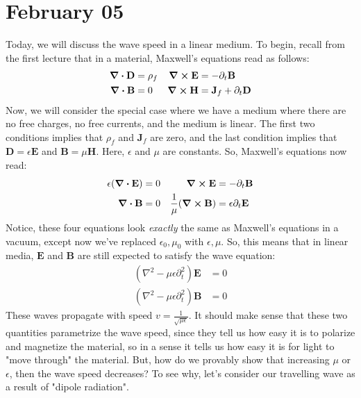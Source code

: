 \section{February 05}
Today, we will discuss the wave speed in a linear medium. To begin, recall from the first lecture that in a
material, Maxwell's equations read as follows:
\begin{align*}
	\div \mathbf{D} &= \rho_f & \curl \mathbf{E} &= -\partial_t \mathbf{B}\\
	\div \mathbf{B} &= 0 & \curl \mathbf{H} &= \mathbf{J}_f + \partial_t \mathbf{D} 
\end{align*}
Now, we will consider the special case where we have a medium where there are no free charges, no free
currents, and the medium is linear. The first two conditions implies that \( \rho_f \) and \( \mathbf{J}_f\)
are zero, and the last condition implies that \( \mathbf{D} = \epsilon \mathbf{E} \) and \( \mathbf{B} = \mu
\mathbf{H}\). Here, \( \epsilon \) and \( \mu \) are constants. So, Maxwell's equations now read:
\begin{align*}
	\epsilon (\div \mathbf{E}) &= 0 & \curl \mathbf{E} &= -\partial_t \mathbf{B}\\
	\div \mathbf{B} &= 0 & \frac{1}{\mu}(\curl \mathbf{B}) &= \epsilon \partial_t \mathbf{E}
\end{align*}
Notice, these four equations look \textit{exactly} the same as Maxwell's equations in a vacuum, except now
we've replaced \( \epsilon_0, \mu_0 \) with \( \epsilon, \mu \). So, this means that in linear media, \(
\mathbf{E} \) and \( \mathbf{B} \) are still expected to satisfy the wave equation:
\begin{align*}
	(\nabla^2 - \mu \epsilon \partial_t^2)\mathbf{E} &= 0\\
	(\nabla^2 - \mu \epsilon \partial_t^2) \mathbf{B} &= 0 
\end{align*}
These waves propagate with speed \( v = \frac{1}{\sqrt{\mu \epsilon}} \). It should make sense that these two
quantities parametrize the wave speed, since they tell us how easy it is to polarize and magnetize the
material, so in a sense it tells us how easy it is for light to "move through" the material. But, how do we
provably show that increasing \( \mu \) or \( \epsilon \), then the wave speed decreases? To see why, let's
consider our travelling wave as a result of "dipole radiation". 

